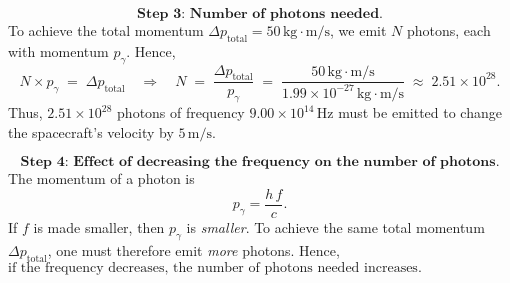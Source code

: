 \documentclass[12pt]{article}
\theoremstyle{definition} %
\theoremstyle{plain} %
\begin{document}
\[
\textbf{Step 3: Number of photons needed.}
\]
To achieve the total momentum \(\Delta p_\text{total} = 50\,\text{kg}\cdot\text{m/s}\), we emit \(N\) photons, each with momentum \(p_\gamma\). Hence,
\[
N \times p_\gamma
\;=\;
\Delta p_\text{total}
\quad\Longrightarrow\quad
N
\;=\;
\frac{\Delta p_\text{total}}{p_\gamma}
\;=\;
\frac{50\,\text{kg}\cdot\text{m/s}}
     {1.99\times 10^{-27}\,\text{kg}\cdot\text{m/s}}
\;\approx\;
2.51\times 10^{28}.
\]
Thus, \(\boxed{2.51\times 10^{28}}\) photons of frequency \(9.00\times 10^{14}\,\text{Hz}\) must be emitted to change the spacecraft's velocity by \(5\,\text{m/s}\).

\[
\textbf{Step 4: Effect of decreasing the frequency on the number of photons.}
\]
The momentum of a photon is
\[
p_\gamma = \frac{h\,f}{c}.
\]
If \(f\) is made smaller, then \(p_\gamma\) is \emph{smaller}. To achieve the same total momentum \(\Delta p_\text{total}\), one must therefore emit \emph{more} photons. Hence, \(\boxed{\text{if the frequency decreases, the number of photons needed increases}.}\)
\end{document}
